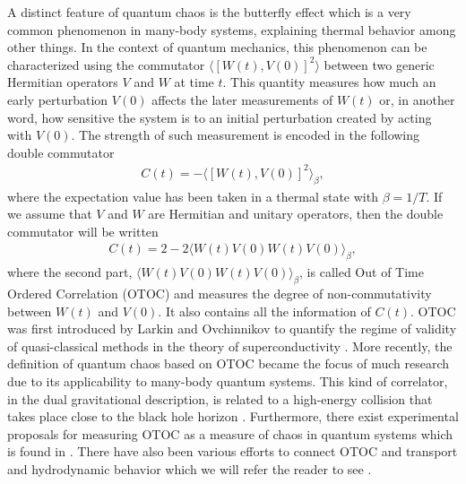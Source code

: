 \documentclass[preprintnumbers,aps,prd,longbibliography,nofootinbib,nobibnotes,amsmath,amssymb]{revtex4}
\begin{document}
 A distinct feature of quantum chaos is the butterfly effect  which is a very common phenomenon in many-body systems, explaining thermal behavior among other things. In the context of quantum mechanics, this phenomenon can be characterized using the commutator $\langle[W(t), V (0)]^2\rangle$ between two generic Hermitian operators $V$ and $W$ at time $t$. This quantity measures how much an early perturbation $V(0)$ affects the later measurements of $W(t)$ or, in another word, how sensitive the system is to an initial perturbation created by acting with $V(0)$. The strength of such measurement  is encoded in the following double commutator 
 \begin{align}\label{c(t)}
C(t)= - \langle [W(t),V(0)]^{2}\rangle _{\beta},
 \end{align}
 where the expectation value has been taken in a thermal state with  $\beta = 1/T$. If we assume that $V$ and $W$ are Hermitian and unitary operators, then the double commutator will be written 
 \begin{align}
 C(t)= 2 - 2 \langle W(t) V(0) W(t) V(0) \rangle _{\beta},
  \end{align}
 where the second part, $\langle W(t) V(0) W(t) V(0) \rangle _{\beta}$,  is called Out of Time Ordered Correlation (OTOC) and measures the degree of non-commutativity between $W(t)$ and $V(0)$. It also contains all the information of $ C(t)$. OTOC was first introduced by Larkin and Ovchinnikov to quantify the regime of validity of quasi-classical methods in the theory of superconductivity \cite{Larkin}. More recently, the definition of quantum chaos based on  OTOC became the focus of much research due to its applicability to many-body quantum systems. This kind of correlator, in the dual gravitational description, is related to  a high-energy collision that takes place close to the black hole horizon  \cite{Shenker:2013pqa,Shenker:2013yza,Shenker:2014cwa,Roberts:2014ifa,Roberts:2014isa,A. Kitaev1,A. Kitaev2,Ahn:2019rnq,Jensen:2016pah,Alishahiha:2016cjk,Wang:2022mcq}. Furthermore, there exist experimental proposals for measuring OTOC as a measure of chaos in quantum systems which is found in \cite{Swingle:2016var,Zhu:2016uws,Yao:2016ayk,Li:2016xhw}.
 There have also been various efforts to connect OTOC and  transport and hydrodynamic behavior which we will refer the reader to see \cite{Blake:2016jnn,Blake:2016wvh,Blake:2016sud,Blake:2017qgd,Grozdanov:2017ajz,Blake:2017ris,Grozdanov:2018atb,Lucas:2017ibu,Hartman:2017hhp,Haehl:2018izb,Hartman:2017hhp1,Gu:2016oyy,Davison:2016ngz,Patel:2016wdy,Baggioli:2018afg,Jeong:2021zhz,Kovtun:2005ev}.
\end{document}
